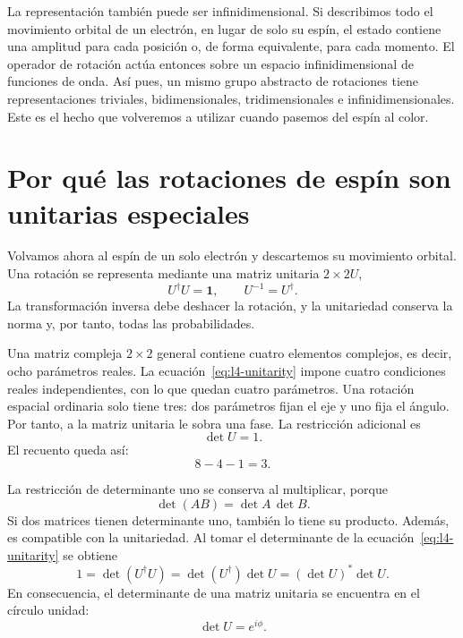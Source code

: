 La representación también puede ser infinidimensional. Si describimos todo el movimiento orbital de un electrón, en lugar de solo su espín, el estado contiene una amplitud para cada posición o, de forma equivalente, para cada momento. El operador de rotación actúa entonces sobre un espacio infinidimensional de funciones de onda. Así pues, un mismo grupo abstracto de rotaciones tiene representaciones triviales, bidimensionales, tridimensionales e infinidimensionales. Este es el hecho que volveremos a utilizar cuando pasemos del espín al color.

\section{Por qué las rotaciones de espín son unitarias especiales}

Volvamos ahora al espín de un solo electrón y descartemos su movimiento orbital. Una rotación se representa mediante una matriz unitaria \(2\times2\)\(U\),
\begin{equation}
U^\dagger U=\boldsymbol 1,
\qquad
U^{-1}=U^\dagger.
\label{eq:l4-unitarity}
\end{equation}
La transformación inversa debe deshacer la rotación, y la unitariedad conserva la norma y, por tanto, todas las probabilidades.

Una matriz compleja \(2\times2\) general contiene cuatro elementos complejos, es decir, ocho parámetros reales. La ecuación~\eqref{eq:l4-unitarity} impone cuatro condiciones reales independientes, con lo que quedan cuatro parámetros. Una rotación espacial ordinaria solo tiene tres: dos parámetros fijan el eje y uno fija el ángulo. Por tanto, a la matriz unitaria le sobra una fase. La restricción adicional es
\begin{equation}
\det U=1.
\label{eq:l4-det-one}
\end{equation}
El recuento queda así:
\begin{equation}
8-4-1=3.
\end{equation}

La restricción de determinante uno se conserva al multiplicar, porque
\begin{equation}
\det(AB)=\det A\,\det B.
\end{equation}
Si dos matrices tienen determinante uno, también lo tiene su producto. Además, es compatible con la unitariedad. Al tomar el determinante de
la ecuación~\eqref{eq:l4-unitarity} se obtiene
\begin{equation}
1=\det(U^\dagger U)
=\det(U^\dagger)\det U
=(\det U)^*\det U.
\end{equation}
En consecuencia, el determinante de una matriz unitaria se encuentra en el círculo unidad:
\begin{equation}
\det U=e^{i\phi}.
\end{equation}

